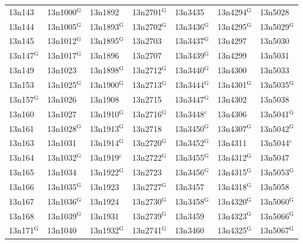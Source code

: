 \documentclass[12pt, oneside]{amsart}
\begin{document}
{\begin{longtable}{*{7}{>{\raggedright\arraybackslash}p{}}}
13n143 & 13n1000$^{\mathrm{G}}$ & 13n1892 & 13n2701$^{\mathrm{G}}$ & 13n3435 & 13n4294$^{\mathrm{G}}$ & 13n5028 \\
13n144 & 13n1005$^{\mathrm{G}}$ & 13n1893$^{\mathrm{G}}$ & 13n2702$^{\mathrm{G}}$ & 13n3436$^{\mathrm{G}}$ & 13n4295$^{\mathrm{G}}$ & 13n5029$^{\mathrm{G}}$ \\
13n145 & 13n1012$^{\mathrm{G}}$ & 13n1895$^{\mathrm{G}}$ & 13n2703 & 13n3437$^{\mathrm{G}}$ & 13n4297 & 13n5030 \\
13n147$^{\mathrm{G}}$ & 13n1017$^{\mathrm{G}}$ & 13n1896 & 13n2707 & 13n3439$^{\mathrm{G}}$ & 13n4299 & 13n5031 \\
13n149 & 13n1023 & 13n1898$^{\mathrm{G}}$ & 13n2712$^{\mathrm{G}}$ & 13n3440$^{\mathrm{G}}$ & 13n4300 & 13n5033 \\
13n153 & 13n1025$^{\mathrm{G}}$ & 13n1900$^{\mathrm{G}}$ & 13n2713$^{\mathrm{G}}$ & 13n3444$^{\mathrm{G}}$ & 13n4301$^{\mathrm{G}}$ & 13n5035$^{\mathrm{G}}$ \\
13n157$^{\mathrm{G}}$ & 13n1026 & 13n1908 & 13n2715 & 13n3447$^{\mathrm{G}}$ & 13n4302 & 13n5038 \\
13n160 & 13n1027 & 13n1910$^{\mathrm{G}}$ & 13n2716$^{\mathrm{G}}$ & 13n3448$^{\mathrm{c}}$ & 13n4306 & 13n5041$^{\mathrm{G}}$ \\
13n161 & 13n1028$^{\mathrm{G}}$ & 13n1913$^{\mathrm{G}}$ & 13n2718 & 13n3450$^{\mathrm{G}}$ & 13n4307$^{\mathrm{G}}$ & 13n5042$^{\mathrm{G}}$ \\
13n163 & 13n1031 & 13n1914$^{\mathrm{G}}$ & 13n2720$^{\mathrm{G}}$ & 13n3452$^{\mathrm{G}}$ & 13n4311 & 13n5044$^{\mathrm{c}}$ \\
13n164 & 13n1032$^{\mathrm{G}}$ & 13n1919$^{\mathrm{c}}$ & 13n2722$^{\mathrm{G}}$ & 13n3455$^{\mathrm{G}}$ & 13n4312$^{\mathrm{G}}$ & 13n5047 \\
13n165 & 13n1034 & 13n1922$^{\mathrm{G}}$ & 13n2723 & 13n3456$^{\mathrm{G}}$ & 13n4315$^{\mathrm{G}}$ & 13n5053$^{\mathrm{G}}$ \\
13n166 & 13n1035$^{\mathrm{G}}$ & 13n1923 & 13n2727$^{\mathrm{G}}$ & 13n3457 & 13n4318$^{\mathrm{G}}$ & 13n5058 \\
13n167 & 13n1036$^{\mathrm{G}}$ & 13n1924 & 13n2730$^{\mathrm{G}}$ & 13n3458$^{\mathrm{G}}$ & 13n4320$^{\mathrm{G}}$ & 13n5060$^{\mathrm{G}}$ \\
13n168 & 13n1039$^{\mathrm{G}}$ & 13n1931 & 13n2739$^{\mathrm{G}}$ & 13n3459 & 13n4323$^{\mathrm{G}}$ & 13n5066$^{\mathrm{G}}$ \\
13n171$^{\mathrm{G}}$ & 13n1040 & 13n1932$^{\mathrm{G}}$ & 13n2741$^{\mathrm{G}}$ & 13n3460 & 13n4325$^{\mathrm{G}}$ & 13n5067$^{\mathrm{G}}$ \\

\end{longtable}}
\end{document}
